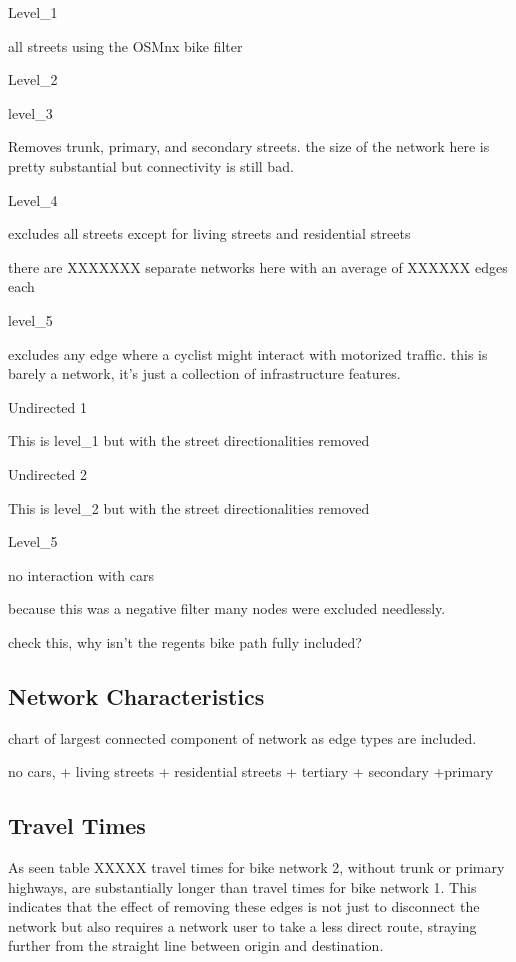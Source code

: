 \documentclass[11pt]{article} %
\begin{document}

Level\_1

all streets using the OSMnx bike filter

Level\_2

level\_3

Removes trunk, primary, and secondary streets. 
the size of the network here is pretty substantial but connectivity is still bad. 

Level\_4

excludes all streets except for living streets and residential streets

there are XXXXXXX separate networks here with an average of XXXXXX edges each

level\_5

excludes any edge where a cyclist might interact with motorized traffic. this is barely a network, it's just a collection of infrastructure features. 


Undirected 1

This is level\_1 but with the street directionalities removed

Undirected 2

This is level\_2 but with the street directionalities removed





Level\_5


no interaction with cars

because this was a negative filter many nodes were excluded needlessly. 

check this, why isn't the regents bike path fully included?


\subsection{Network Characteristics}

chart of largest connected component of network as edge types are included. 

no cars,
+ living streets
+ residential streets
+ tertiary 
+ secondary
+primary

\subsection{Travel Times}

As seen table XXXXX travel times for bike network 2, without trunk or primary highways, are substantially longer than travel times for bike network 1. This indicates that the effect of removing these edges is not just to disconnect the network but also requires a network user to take a less direct route, straying further from the straight line between origin and destination. 
\end{document}
